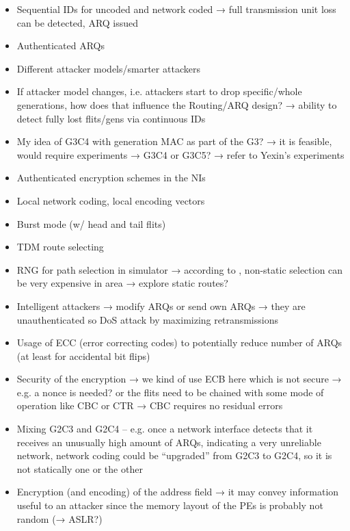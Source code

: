 \begin{itemize}
    \item Sequential IDs for uncoded and network coded → full transmission unit loss can be detected, ARQ issued
    \item Authenticated ARQs
    \item Different attacker models/smarter attackers
    \item If attacker model changes, i.e. attackers start to drop specific/whole generations,
        how does that influence the Routing/ARQ design? → ability to detect fully lost flits/gens via continuous IDs
    \item My idea of G3C4 with generation MAC as part of the G3? → it is feasible, would require experiments → G3C4 or G3C5? → refer to Yexin's
        experiments
    \item Authenticated encryption schemes in the NIs
    \item Local network coding, local encoding vectors
    \item Burst mode (w/ head and tail flits)
    \item TDM route selecting
    \item RNG for path selection in simulator → according to \cite{stefan11enhancingnocs}, non-static selection can be very expensive in area →
        explore static routes?
    \item Intelligent attackers → modify ARQs or send own ARQs → they are unauthenticated so DoS attack by maximizing retransmissions
    \item Usage of ECC (error correcting codes) to potentially reduce number of ARQs (at least for accidental bit flips)
    \item Security of the encryption → we kind of use ECB here which is not secure → e.g. a nonce is needed? or the flits need to be chained with some
        mode of operation like CBC or CTR → CBC requires no residual errors
    \item Mixing G2C3 and G2C4 -- e.g. once a network interface detects that it receives an unusually high amount of ARQs, indicating a very
        unreliable network, network coding could be \enquote{upgraded} from G2C3 to G2C4, so it is not statically one or the other
    \item Encryption (and encoding) of the address field → it may convey information useful to an attacker since the memory layout of the PEs is probably not random
        (→ ASLR?)
\end{itemize}
